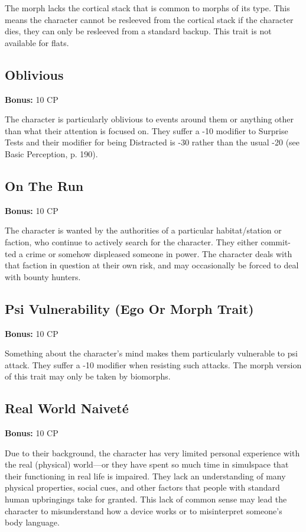 The morph lacks the cortical stack that is common to morphs of its type. This means the character cannot be resleeved from the cortical stack if the character dies, they can only be resleeved from a standard backup. This trait is not available for flats. 

\subsection{Oblivious} \label{sec:traits-oblivious} 

\textbf{Bonus:} 10 CP 

The character is particularly oblivious to events around them or anything other than what their attention is focused on. They suffer a -10 modifier to Surprise Tests and their modifier for being Distracted is -30 rather than the usual -20 (see Basic Perception, p. 190). 

\subsection{On The Run} \label{sec:traits-on-the-run} 

\textbf{Bonus:} 10 CP 

The character is wanted by the authorities of a particular habitat/station or faction, who continue to actively search for the character. They either commit- ted a crime or somehow displeased someone in power. The character deals with that faction in question at their own risk, and may occasionally be forced to deal with bounty hunters. 

\subsection{Psi Vulnerability (Ego Or Morph Trait)} \label{sec:traits-psi-vulnerability} 

\textbf{Bonus:} 10 CP 

Something about the character’s mind makes them particularly vulnerable to psi attack. They suffer a -10 modifier when resisting such attacks. The morph version of this trait may only be taken by biomorphs. 

\subsection{Real World Naiveté} \label{sec:traits-real-world-naivite} 

\textbf{Bonus:} 10 CP 

Due to their background, the character has very limited personal experience with the real (physical) world—or they have spent so much time in simulspace that their functioning in real life is impaired. They lack an understanding of many physical properties, social cues, and other factors that people with standard human upbringings take for granted. This lack of common sense may lead the character to misunderstand how a device works or to misinterpret someone’s body language. 

